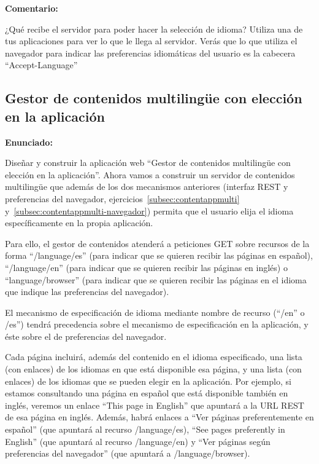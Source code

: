 \textbf{Comentario:}

¿Qué recibe el servidor para poder hacer la selección de idioma? Utiliza una de tus aplicaciones para ver lo que le llega al servidor. Verás que lo que utiliza el navegador para indicar las preferencias idiomáticas del usuario es la cabecera ``Accept-Language''

\subsection{Gestor de contenidos multilingüe con elección en la aplicación}
\label{subsec:contentappmulti-apli}

\textbf{Enunciado:}

Diseñar y construir la aplicación web ``Gestor de contenidos multilingüe con elección en la aplicación''. Ahora vamos a construir un servidor de contenidos multilingüe que además de los dos mecanismos anteriores (interfaz REST y preferencias del navegador, ejercicios~\ref{subsec:contentappmulti} y~\ref{subsec:contentappmulti-navegador}) permita que el usuario elija el idioma específicamente en la propia aplicación.

Para ello, el gestor de contenidos atenderá a peticiones GET sobre recursos de la forma ``/language/es'' (para indicar que se quieren recibir las páginas en español), ``/language/en'' (para indicar que se quieren recibir las páginas en inglés) o ``language/browser'' (para indicar que se quieren recibir las páginas en el idioma que indique las preferencias del navegador).

El mecanismo de especificación de idioma mediante nombre de recurso (``/en'' o /es'') tendrá precedencia sobre el mecanismo de especificación en la aplicación, y éste sobre el de preferencias del navegador.

Cada página incluirá, además del contenido en el idioma especificado, una lista (con enlaces) de los idiomas en que está disponible esa página, y una lista (con enlaces) de los idiomas que se pueden elegir en la aplicación. Por ejemplo, si estamos consultando una página en español que está disponible también en inglés, veremos un enlace ``This page in English'' que apuntará a la URL REST de esa página en inglés. Además, habrá enlaces a ``Ver páginas preferentemente en español'' (que apuntará al recurso /language/es), ``See pages preferently in English'' (que apuntará al recurso /language/en) y ``Ver páginas según preferencias del navegador'' (que apuntará a /language/browser).

